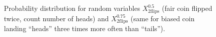 \documentclass[nobib,nofonts]{tufte-handout}
\renewcommand{\markdef}[1]{\emph{#1}}
\begin{document}
\begin{example}
\begin{figure}
  \caption{Probability distribution for random variables $X_{\text{2flips}}^{0.5}$ (fair coin flipped twice, count number of heads) and $X_{\text{2flips}}^{0.75}$ (same for biased coin landing ``heads'' three times more often than ``tails'').}
  \label{fig:two-flips}
\end{figure}

\end{example}



\end{document}
